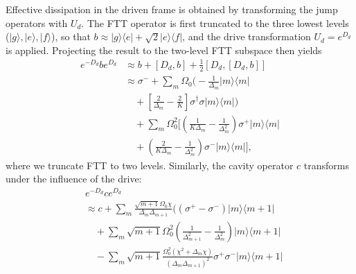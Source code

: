 Effective dissipation in the driven frame is obtained by transforming the jump operators with $U_d$. The FTT operator is first truncated to the three lowest levels ($|g\rangle, |e\rangle, |f\rangle$), so that $b \approx |g\rangle\langle e| + \sqrt{2}|e\rangle\langle f|$, and the drive transformation $U_d=e^{D_d}$ is applied. Projecting the result to the two-level FTT subspace then yields
\begin{align}
\label{eq:transformb}
    e^{-D_d} b e^{D_d} &\approx b + [D_d,b] +\frac{1}{2}[D_d,[D_d,b]] \nonumber \\
    &\approx \sigma^- + \sum_m \Omega_0 \bigg( -\frac{1}{\Delta_m} |m\rangle\langle m| \nonumber \\
    &\quad + \left[ \frac{2}{\Delta_m} - \frac{2}{K} \right] \sigma^\dagger \sigma |m\rangle\langle m| \bigg) \nonumber \\
    &\quad + \sum_m \Omega_0^2 \bigg[ \left( \frac{1}{K \Delta_m} - \frac{1}{\Delta_m^2} \right) \sigma^+ |m\rangle\langle m| \nonumber \\
    &\quad + \left( \frac{2}{K \Delta_m} - \frac{1}{\Delta_m^2} \right) \sigma^- |m\rangle\langle m| \bigg],
\end{align}
where we truncate FTT to two levels.
Similarly, the cavity operator $c$ transforms under the influence of the drive:
\begin{align}
\label{eq:transformc}
    &e^{-D_d} c e^{D_d}\nonumber \\
    &\approx c + \sum_m \frac{\sqrt{m+1} \Omega_0 \chi}{\Delta_{ m} \Delta_{ m+1}} \big( (\sigma^+ - \sigma^-)|m\rangle\langle m+1|    \nonumber \\
    &\quad + \sum_m \sqrt{m+1} \Omega_0^2 \left( \frac{1}{\Delta_{ m+1}^2} - \frac{1}{\Delta_{ m}^2} \right) |m\rangle\langle m+1| \nonumber \\
    &\quad - \sum_m \sqrt{m+1} \frac{\Omega_0^2 (\chi^2 + \Delta_{m} \chi)}{(\Delta_{m} \Delta_{ m+1})^2} \sigma^+ \sigma^- |m\rangle\langle m+1|
\end{align}


